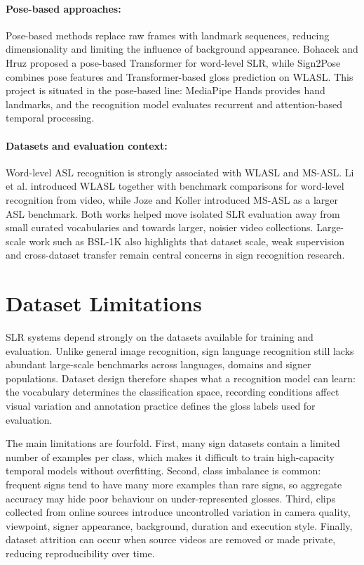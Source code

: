 \paragraph{Pose-based approaches:}
Pose-based methods replace raw frames with landmark sequences, reducing dimensionality and limiting
the influence of background appearance. Bohacek and Hruz \cite{bohacek2022spoter} proposed a
pose-based Transformer for word-level SLR, while Sign2Pose \cite{eunice2023sign2pose} combines pose
features and Transformer-based gloss prediction on WLASL. This project is situated in the
pose-based line: MediaPipe Hands provides hand landmarks, and the recognition model evaluates
recurrent and attention-based temporal processing.

\paragraph{Datasets and evaluation context:}
Word-level ASL recognition is strongly associated with WLASL and MS-ASL. Li et al.
\cite{li2020wlasl} introduced WLASL together with benchmark comparisons for word-level recognition
from video, while Joze and Koller \cite{joze2019msasl} introduced MS-ASL as a larger ASL benchmark.
Both works helped move isolated SLR evaluation away from small curated vocabularies and towards
larger, noisier video collections. Large-scale work such as BSL-1K \cite{albanie2020bsl1k} also
highlights that dataset scale, weak supervision and cross-dataset transfer remain central concerns
in sign recognition research.

\section{Dataset Limitations}
\label{sec:sota_datasets}

SLR systems depend strongly on the datasets available for training and evaluation. Unlike general
image recognition, sign language recognition still lacks abundant large-scale benchmarks across
languages, domains and signer populations. Dataset design therefore shapes what a recognition model
can learn: the vocabulary determines the classification space, recording conditions affect visual
variation and annotation practice defines the gloss labels used for evaluation.

The main limitations are fourfold. First, many sign datasets contain a limited number of examples
per class, which makes it difficult to train high-capacity temporal models without overfitting.
Second, class imbalance is common: frequent signs tend to have many more examples than rare signs,
so aggregate accuracy may hide poor behaviour on under-represented glosses. Third, clips collected
from online sources introduce uncontrolled variation in camera quality, viewpoint, signer
appearance, background, duration and execution style. Finally, dataset attrition can occur when
source videos are removed or made private, reducing reproducibility over time.

